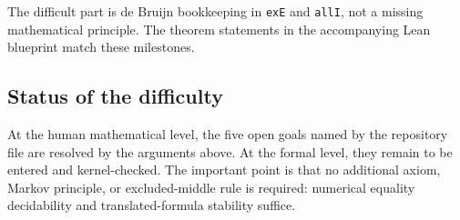 The difficult part is de Bruijn bookkeeping in \texttt{exE} and \texttt{allI}, not a missing mathematical principle.  The theorem statements in the accompanying Lean blueprint match these milestones.

\subsection{Status of the difficulty}

At the human mathematical level, the five open goals named by the repository file are resolved by the arguments above.  At the formal level, they remain to be entered and kernel-checked.  The important point is that no additional axiom, Markov principle, or excluded-middle rule is required: numerical equality decidability and translated-formula stability suffice.
